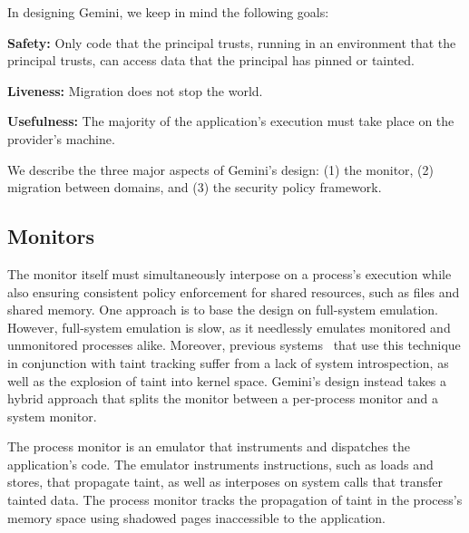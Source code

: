 In designing Gemini, we keep in mind the following goals:

\begin{widelist}
    \item \textbf{Safety:} Only code that the principal trusts, running in an
        environment that the principal trusts, can access data that the
        principal has pinned or tainted.

    \item \textbf{Liveness:} Migration does not stop the world.

    \item \textbf{Usefulness:} The majority of the application's execution must
        take place on the provider's machine.
\end{widelist}


We describe the three major aspects of Gemini's design: (1) the monitor, (2)
migration between domains, and (3) the security policy framework.
%
%


\subsection{Monitors}
%
The monitor itself must simultaneously interpose on a process's execution while
also ensuring consistent policy enforcement for shared resources, such as files
and shared memory.
%
One approach is to base the design on full-system emulation.
%
However, full-system emulation is slow, as it needlessly emulates
monitored and unmonitored processes alike.
%
Moreover, previous
systems~\cite{whole-system-simulation,panorama,demand-emulation} that use this
technique in conjunction with taint tracking suffer from a lack of system
introspection, as well as the explosion of taint into kernel space.
%
Gemini's design instead takes a hybrid approach that splits the monitor between a
per-process monitor and a system monitor.



%
The process monitor is an emulator that instruments and dispatches the
application's code.
%
The emulator instruments instructions, such as
loads and stores, that propagate taint, as well as interposes on
system calls that transfer tainted data.
%
The process monitor tracks the propagation of taint in the process's
memory space using shadowed pages inaccessible to the application.



